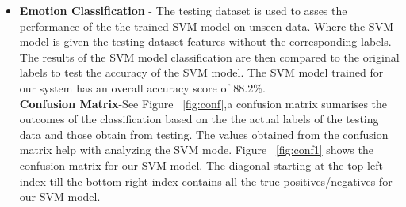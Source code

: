\begin{itemize}
\item \textbf{Emotion Classification} - The testing dataset is used to asses the performance of the the trained SVM model on unseen data. Where the SVM model is given the testing dataset features without the corresponding labels. The results of the SVM model classification are then compared to the original labels to test the accuracy of the SVM model. The SVM model trained for our system has an overall accuracy score of 88.2\%.\\

\textbf{Confusion Matrix}-See Figure ~\ref{fig:conf},a confusion matrix sumarises the outcomes of the classification based on the the actual labels of the testing data and those obtain from testing. The values obtained from the confusion matrix help with analyzing the SVM mode. Figure ~\ref{fig:conf1} shows the confusion matrix for our SVM model. The diagonal starting at the top-left index till the bottom-right index contains all the true positives/negatives for our SVM model.


\end{itemize}
